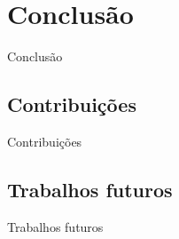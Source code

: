 
\section{Conclusão}
\begin{frame}{Conclusão}\justifying
\end{frame}

\subsection{Contribuições}
\begin{frame}{Contribuições}\justifying

\end{frame}

\subsection{Trabalhos futuros}
\begin{frame}{Trabalhos futuros}\justifying
    
\end{frame}

